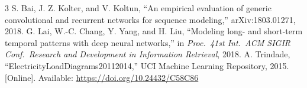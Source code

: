 \documentclass[10pt,a4paper]{article}
\begin{document}
{\small
\begin{thebibliography}{3}
 S. Bai, J. Z. Kolter, and V. Koltun, ``An empirical evaluation of generic convolutional and recurrent networks for sequence modeling,'' arXiv:1803.01271, 2018.
 G. Lai, W.-C. Chang, Y. Yang, and H. Liu, ``Modeling long- and short-term temporal patterns with deep neural networks,'' in \emph{Proc.\ 41st Int.\ ACM SIGIR Conf.\ Research and Development in Information Retrieval}, 2018.
 A. Trindade, ``ElectricityLoadDiagrams20112014,'' UCI Machine Learning Repository, 2015. [Online]. Available: \url{https://doi.org/10.24432/C58C86}
\end{thebibliography}}
\end{document}
